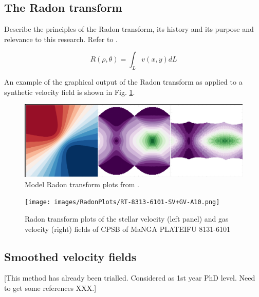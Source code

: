\subsection{The Radon transform}
Describe the principles of the Radon transform, its history and its purpose and relevance to this research. Refer to \cite{2018MNRAS.480.2217S}.

\begin{equation}
    \label{eqn:radon}
    R(\rho,\theta)=\int_{L}{v(x,y) dL} 
\end{equation}

An example of the graphical output of the Radon transform as applied to a synthetic velocity field is shown in Fig. \ref{fig:Radon}.

\begin{figure}
    \centering
   	\includegraphics{images/RadonPlots/example2.png}
    \caption{Model Radon transform plots from \citet{2018MNRAS.480.2217S}.}
    \label{fig:Radon}
\end{figure}


\begin{figure}
    \centering
   	\texttt{[image: images/RadonPlots/RT-8313-6101-SV+GV-A10.png]}
    \caption{Radon transform plots of the stellar velocity (left panel) and gas velocity (right) fields of CPSB of MaNGA PLATEIFU 8131-6101}
    \label{fig:RT_8131-6101}
\end{figure}

\subsection{Smoothed velocity fields}
[This method has already been trialled. Considered as 1st year PhD level. Need to get some references XXX.]
